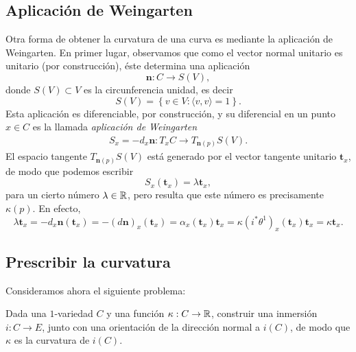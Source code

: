 \documentclass[11pt,a4paper]{amsbook}
\theoremstyle{remark} \newtheorem{rmk}[subsection]{Observación}
\theoremstyle{definition} \newtheorem{defn}[subsection]{Definición}
\theoremstyle{definition} \newtheorem{ex}[subsection]{Ejemplo}
\theoremstyle{definition} \newtheorem{ej}[subsection]{Ejercicio}
\begin{document}
\subsection{Aplicación de Weingarten} Otra forma de obtener la curvatura de una curva es mediante la aplicación de Weingarten. En primer lugar, observamos que como el vector normal unitario es unitario (por construcción), éste determina una aplicación \[\bm{n}:C\rightarrow S(V),\] donde $S(V)\subset V$ es la circunferencia unidad, es decir
\begin{equation*}
S(V) = \left\{ v\in V: \langle v,v\rangle = 1 \right\}.
\end{equation*}
Esta aplicación es diferenciable, por construcción, y su diferencial en un punto $x\in C$ es la llamada \emph{aplicación de Weingarten}
\begin{align*}
S_x=- d_x\bm{n} : T_xC  \rightarrow T_{\bm{n}(p)} S(V).
\end{align*}
El espacio tangente $T_{\bm{n}(p)}S(V)$ está generado por el vector tangente unitario $\bm{t}_x$, de modo que podemos escribir
\begin{equation*}
S_x(\bm{t}_x) = \lambda \bm{t}_x,
\end{equation*}
para un cierto número $\lambda \in \mathbb R$, pero resulta que este número es precisamente $\kappa(p)$. En efecto,
\begin{equation*}
\lambda \bm{t}_x =-d_x\bm{n}(\bm{t}_x) =- (d\bm{n})_x(\bm{t}_x) = \alpha_x(\bm{t}_x) \bm{t}_x = \kappa (i^*\theta^1)_x(\bm{t}_x) \bm{t}_x = \kappa \bm{t}_x.
\end{equation*}

\subsection{Prescribir la curvatura} Consideramos ahora el siguiente problema:

Dada una $1$-variedad $C$ y una función $\kappa:C\rightarrow \mathbb R$, construir una inmersión $i:C\rightarrow E$, junto con una orientación de la dirección normal a $i(C)$, de modo que $\kappa$ es la curvatura de $i(C)$.
\end{document}
